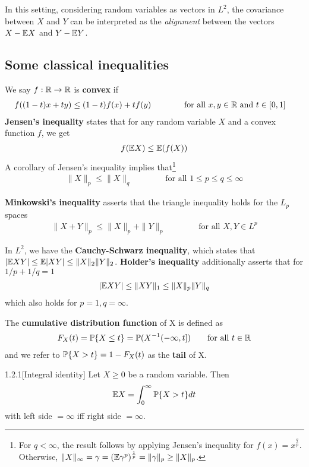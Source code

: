 In this setting, considering random variables as vectors in $L^2$, the covariance between $X$ and $Y$ can be interpreted as the \textit{alignment} between the vectors $X - \E X$ and $Y - \E Y$.

\subsection{Some classical inequalities}

We say $f : \R \to \R$ is \textbf{convex} if
\begin{align*}
    f((1-t)x + ty) \leq (1-t)f(x) + tf(y) &\qquad\qquad\text{for all $x,y\in\R$ and $t\in[0,1]$}
\end{align*}
\textbf{Jensen's inequality} states that for any random variable $X$ and a convex function $f$, we get 
\begin{align*}
    f(\E X) \leq \E(f(X))
\end{align*}
A corollary of Jensen's inequality implies that\footnote{For $q < \infty$, the result follows by applying Jensen's inequality for $f(x) = x^{\frac q p}$. Otherwise, $\|X\|_\infty = \gamma = (\E \gamma^{p})^{\frac1p} = \|\gamma\|_p \geq \|X\|_p$.}
\begin{align*}
    \| X\|_p \leq \|X\|_q \qquad\qquad\text{for all $1\leq p \leq q\leq \infty$}
\end{align*}

\textbf{Minkowski's inequality} asserts that the triangle inequality holds for the $L_p$ spaces
\begin{align*}
\|X +  Y\|_p \leq \|X\|_p + \|Y\|_p \qquad\qquad\text{for all $X,Y \in L^p$}
\end{align*}

In $L^2$, we have the \textbf{Cauchy-Schwarz inequality}, which states that $|\E XY| \leq \E |XY| \leq \|X\|_2 \|Y\|_2$. \textbf{Holder's inequality} additionally asserts that for $1/p + 1/q =1$
\begin{align*}
    |\E X Y| \leq \|XY\|_1 \leq \|X\|_p\|Y\|_q
\end{align*}
which also holds for $p=1, q=\infty$.

The \textbf{cumulative distribution function} of X is defined as
\begin{align*}
    F_X(t) = \P\{X \leq t\} = \P(X^{-1}(-\infty,t]) \qquad\text{for all $t\in\R$}
\end{align*}
and we refer to $\P\{X > t\} = 1 - F_X(t)$ as the \textbf{tail} of X.

\begin{lemma}{1.2.1}[Integral identity]\label{1.2.1}
Let $X\geq0$ be a random variable. Then 
\begin{align*}
    \E X = \int^\infty_0\P\{X>t\}dt
\end{align*}
with left side $=\infty$ iff right side $=\infty$.
\end{lemma}

